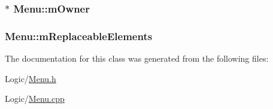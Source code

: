 \subsubsection[{\texorpdfstring{m\+Owner}{mOwner}}]{$\ast$ Menu\+::m\+Owner\hspace{0.3cm}{\ttfamily [private]}}\hypertarget{classMenu_a36358711e2674ecda672dc659aaf0473}{}\label{classMenu_a36358711e2674ecda672dc659aaf0473}
\subsubsection[{\texorpdfstring{m\+Replaceable\+Elements}{mReplaceableElements}}]{ Menu\+::m\+Replaceable\+Elements\hspace{0.3cm}{\ttfamily [private]}}\hypertarget{classMenu_a1ff659d527f6648207ae7045a9b58ab6}{}\label{classMenu_a1ff659d527f6648207ae7045a9b58ab6}


The documentation for this class was generated from the following files\+:\begin{DoxyCompactItemize}
\item 
Logic/\hyperlink{Menu_8h}{Menu.\+h}\item 
Logic/\hyperlink{Menu_8cpp}{Menu.\+cpp}\end{DoxyCompactItemize}
